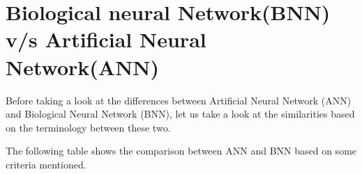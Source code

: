 \documentclass{report}
\begin{document}
\section{Biological neural Network(BNN) v/s Artificial Neural Network(ANN)}
Before taking a look at the differences between Artificial Neural Network (ANN) and Biological Neural Network (BNN), let us take a look at the similarities based on the terminology between these two.



\begin{center}


\end{center}



The following table shows the comparison between ANN and BNN based on some criteria mentioned.





\end{document}
